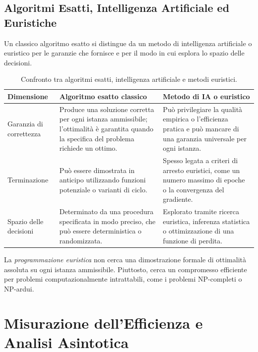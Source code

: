 \subsection{Algoritmi Esatti, Intelligenza Artificiale ed Euristiche}
\label{sec:exact-vs-heuristic}

Un classico algoritmo esatto si distingue da un metodo di intelligenza artificiale o euristico per le garanzie che fornisce e per il modo in cui esplora lo spazio delle decisioni.

\begin{table}[H]
  \centering
  \caption{Confronto tra algoritmi esatti, intelligenza artificiale e metodi euristici.}
  \label{tab:algorithm-comparison}
  \begin{tabularx}{\textwidth}{@{}>{\raggedright\arraybackslash}p{}YY@{}}
    \toprule
    Dimensione & Algoritmo esatto classico & Metodo di IA o euristico \\
    \midrule
    Garanzia di correttezza & Produce una soluzione corretta per ogni istanza ammissibile; l'ottimalità è garantita quando la specifica del problema richiede un ottimo. & Può privilegiare la qualità empirica o l'efficienza pratica e può mancare di una garanzia universale per ogni istanza. \\
    Terminazione & Può essere dimostrata in anticipo utilizzando funzioni potenziale o varianti di ciclo. & Spesso legata a criteri di arresto euristici, come un numero massimo di epoche o la convergenza del gradiente. \\
    Spazio delle decisioni & Determinato da una procedura specificata in modo preciso, che può essere deterministica o randomizzata. & Esplorato tramite ricerca euristica, inferenza statistica o ottimizzazione di una funzione di perdita. \\
    \bottomrule
  \end{tabularx}
\end{table}

La \emph{programmazione euristica} non cerca una dimostrazione formale di ottimalità assoluta su ogni istanza ammissibile. Piuttosto, cerca un compromesso efficiente per problemi computazionalmente intrattabili, come i problemi NP-completi o NP-ardui.

\section{Misurazione dell'Efficienza e Analisi Asintotica}
\label{sec:asymptotic-analysis}

